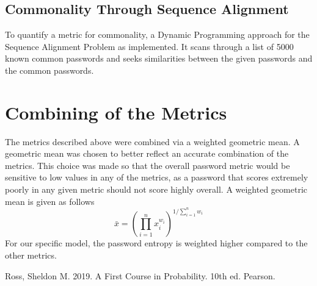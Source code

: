 \documentclass{article}
\begin{document}
\subsection{Commonality Through Sequence Alignment}
To quantify a metric for commonality, a Dynamic Programming approach for the Sequence Alignment Problem as implemented. It scans through a list of 5000 known common passwords and seeks similarities between the given passwords and the common passwords.


\section{Combining of the Metrics}
The metrics described above were combined via a weighted geometric mean. A geometric mean was chosen to better reflect an accurate combination of the metrics. 
This choice was made so that the overall password metric would be sensitive to low values in any of the metrics, as a password that scores extremely poorly in any given metric should not score highly overall.
A weighted geometric mean is given as follows
\[
\bar{x} = \left(\prod_{i=1}^{n} x_i^{w_i}\right)^{1/\sum_{i=1}^n w_i}
\]
For our specific model, the password entropy is weighted higher compared to the other metrics.

\newpage
\begin{thebibliography}{00}
 Ross, Sheldon M. 2019. A First Course in Probability. 10th ed. Pearson.
\end{thebibliography}
\end{document}
